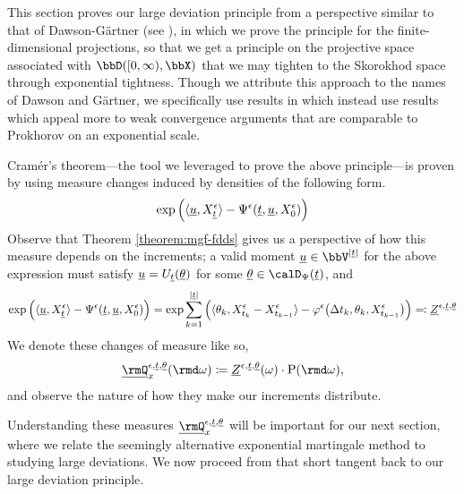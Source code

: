 This section proves our large deviation principle from a perspective similar to that of Dawson-G\"artner (see \cite[Theorem 4.6.1]{dembo2010}), in which we prove the principle for the finite-dimensional projections, so that we get a principle on the projective space associated with $\pathSpace{[0,\infty)}{\stateSpace}$ that we may tighten to the Skorokhod space through exponential tightness.
Though we attribute this approach to the names of Dawson and G\"artner, we specifically use results in \cite{feng2006} which instead use results which appeal more to weak convergence arguments that are comparable to Prokhorov on an exponential scale.



Cram\'er's theorem---the tool we leveraged to prove the above principle---is proven by using measure changes induced by densities of the following form.
\begin{equation*}
  \exp\Big( {\langle \underline{u} , X^\epsilon_{\underline t} \rangle} - \Psi^\epsilon(\underline t, \underline{u}, X^\epsilon_0) \Big)
\end{equation*}
Observe that Theorem \ref{theorem:mgf-fdds} gives us a perspective of how this measure depends on the increments; a valid moment $\underline\momentVar \in \vecSpace^{|\underline t|}$ for the above expression must satisfy $\underline{u} = U_{\underline t}(\underline{\theta})$ for some $\underline\twistVar \in \momentSpace(\underline t)$, and
\begin{equation*}
  \exp\Big( {\langle \underline{u} , X^\epsilon_{\underline t} \rangle} - \Psi^\epsilon(\underline t, \underline{u}, X^\epsilon_0) \Big) = 
  \exp\sum_{k=1}^{|\underline t|} \Big( {\langle \theta_k , X^\epsilon_{t_k}-X^\epsilon_{t_{k-1}} \rangle} - \varphi^\epsilon\big(\Delta t_k, \theta_k, X^\epsilon_{t_{k-1}} \big) \Big) \eqqcolon \underline{Z}^{\epsilon, \underline t, \underline{\theta}}
\end{equation*}
We denote these changes of measure like so,
\begin{equation*}
  \fddPrb^{\epsilon,\underline t,\underline\twistVar}_\stateVar(\rmd\omega) \defeq \fddDensity^{\epsilon,\underline t,\underline\twistVar}(\omega) \cdot \Prb(\rmd\omega),
\end{equation*}
and observe the nature of how they make our increments distribute.



Understanding these measures $\fddPrb^{\epsilon,\underline t,\underline\twistVar}_\stateVar$ will be important for our next section, where we relate the seemingly alternative exponential martingale method to studying large deviations.
We now proceed from that short tangent back to our large deviation principle.



